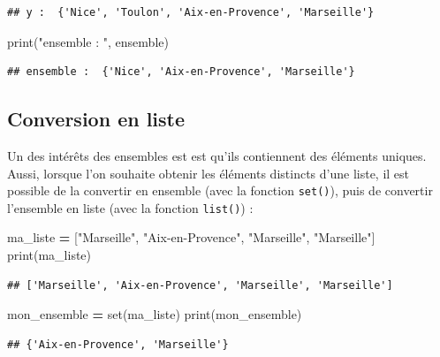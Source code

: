\documentclass[12pt,]{book}
\newenvironment{Shaded}{\begin{snugshade}}{\end{snugshade}}
\newcommand{\StringTok}[1]{\textcolor[rgb]{0.31,0.60,0.02}{#1}}
\newcommand{\OperatorTok}[1]{\textcolor[rgb]{0.81,0.36,0.00}{\textbf{#1}}}
\newcommand{\BuiltInTok}[1]{#1}
\newcommand{\NormalTok}[1]{#1}
\numberwithin{equation}{section}
\numberwithin{countremarque}{section}
\begin{document}
\begin{lstlisting}
## y :  {'Nice', 'Toulon', 'Aix-en-Provence', 'Marseille'}
\end{lstlisting}

\begin{Shaded}
\begin{Highlighting}[]
\BuiltInTok{print}\NormalTok{(}\StringTok{"ensemble : "}\NormalTok{, ensemble)}
\end{Highlighting}
\end{Shaded}

\begin{lstlisting}
## ensemble :  {'Nice', 'Aix-en-Provence', 'Marseille'}
\end{lstlisting}

\subsection{Conversion en liste}\label{conversion-en-liste}

Un des intérêts des ensembles est est qu'ils contiennent des éléments
uniques. Aussi, lorsque l'on souhaite obtenir les éléments distincts
d'une liste, il est possible de la convertir en ensemble (avec la
fonction \texttt{set()}), puis de convertir l'ensemble en liste (avec la
fonction \texttt{list()}) :

\begin{Shaded}
\begin{Highlighting}[]
\NormalTok{ma_liste }\OperatorTok{=}\NormalTok{ [}\StringTok{"Marseille"}\NormalTok{, }\StringTok{"Aix-en-Provence"}\NormalTok{, }\StringTok{"Marseille"}\NormalTok{, }\StringTok{"Marseille"}\NormalTok{]}
\BuiltInTok{print}\NormalTok{(ma_liste)}
\end{Highlighting}
\end{Shaded}

\begin{lstlisting}
## ['Marseille', 'Aix-en-Provence', 'Marseille', 'Marseille']
\end{lstlisting}

\begin{Shaded}
\begin{Highlighting}[]
\NormalTok{mon_ensemble }\OperatorTok{=} \BuiltInTok{set}\NormalTok{(ma_liste)}
\BuiltInTok{print}\NormalTok{(mon_ensemble)}
\end{Highlighting}
\end{Shaded}

\begin{lstlisting}
## {'Aix-en-Provence', 'Marseille'}
\end{lstlisting}
\end{document}
